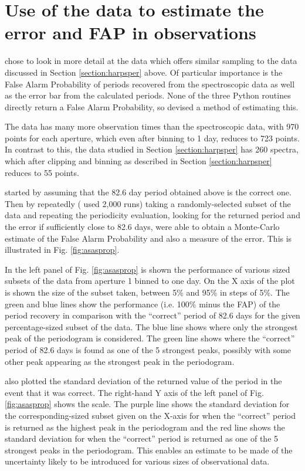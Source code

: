 \section{Use of the {\asas} data to estimate the error and FAP in {\harps} observations}
\protect\label{section:asasfap}

{\FirstP} chose to look in more detail at the {\asas} data which offers similar sampling to the {\harps} data discussed
in Section \ref{section:harpsper} above. Of particular importance is the False Alarm Probability of periods recovered from
the spectroscopic data as well as the error bar from the calculated periods. None of the three Python routines directly
return a False Alarm Probability, so {\Firstp} devised a method of estimating this.

The {\asas} data has many more observation times than the spectroscopic data, with 970 points for each aperture, which
even after binning to 1 day, reduces to 723 points. In contrast to this, the {\harps} data studied in Section
\ref{section:harpsper} has 260 spectra, which after clipping and binning as described in Section \ref{section:harpsper}
reduces to 55 points.

{\FirstP} started by assuming that the 82.6 day period obtained above is the correct one. Then by repeatedly ({\Firstp}
used 2,000 runs) taking a randomly-selected subset of the {\asas} data and repeating the periodicity evaluation, looking
for the returned period and the error if sufficiently close to 82.6 days, {\Firstp} were able to obtain a Monte-Carlo
estimate of the False Alarm Probability and also a measure of the error. This is illustrated in Fig. \ref{fig:asasprop}.

In the left panel of Fig. \ref{fig:asasprop} is shown the performance of various sized subsets of the {\asas} data from
aperture 1 binned to one day.  On the X axis of the plot is shown the size of the subset taken, between 5\% and 95\% in
steps of 5\%. The green and blue lines show the performance (i.e. 100\% minus the FAP) of the period recovery in
comparison with the ``correct'' period of 82.6 days for the given percentage-sized subset of the data. The blue line
shows where only the strongest peak of the periodogram is considered. The green line shows where the ``correct'' period
of 82.6 days is found as one of the 5 strongest peaks, possibly with some other peak appearing as the strongest peak in
the periodogram.

{\FirstP} also plotted the standard deviation of the returned value of the period in the event that it was correct. The
right-hand Y axis of the left panel of Fig. \ref{fig:asasprop} shows the scale. The purple line shows the standard
deviation for the corresponding-sized subset given on the X-axis for when the ``correct'' period is returned as the
highest peak in the periodogram and the red line shows the standard deviation for when the ``correct'' period is returned
as one of the 5 strongest peaks in the periodogram. This enables an estimate to be made of the uncertainty likely to be
introduced for various sizes of observational data.

